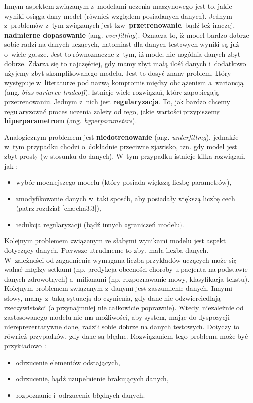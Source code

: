 Innym aspektem związanym z~modelami uczenia maszynowego jest to, jakie wyniki osiąga dany model (również względem posiadanych danych). Jednym z~problemów z~tym związanych jest tzw. \textbf{przetrenowanie}, bądź też inaczej, \textbf{nadmierne dopasowanie} (ang. \textit{overfitting}). Oznacza to, iż model bardzo dobrze sobie radzi na danych uczących, natomiast dla danych testowych wyniki są już o~wiele gorsze. Jest to równoznaczne z~tym, iż model nie uogólnia danych zbyt dobrze. Zdarza się to najczęściej, gdy mamy zbyt małą ilość danych i~dodatkowo użyjemy zbyt skomplikowanego modelu. Jest to dosyć znany problem, który występuje w~literaturze pod nazwą kompromis między obciążeniem a~wariancją (ang. \textit{bias-variance tradeoff}). Istnieje wiele rozwiązań, które zapobiegają przetrenowaniu. Jednym z~nich jest \textbf{regularyzacja}. To, jak bardzo chcemy regularyzować proces uczenia zależy od tego, jakie wartości przypiszemy \textbf{hiperparametrom} (ang. \textit{hyperparameters}). 

Analogicznym problemem jest \textbf{niedotrenowanie} (ang. \textit{underfitting}), jednakże w~tym przypadku chodzi o~dokładnie przeciwne zjawisko, tzn. gdy model jest zbyt prosty (w stosunku do danych). W~tym przypadku istnieje kilka rozwiązań, jak \cite{Sawka18}:
\begin{itemize}
\item
wybór mocniejszego modelu (który posiada większą liczbę parametrów),
\item
zmodyfikowanie danych w~taki sposób, aby posiadały większą liczbę cech (patrz rozdział \ref{cha:cha3.3}),
\item
redukcja regularyzacji (bądź innych ograniczeń modelu).
\end{itemize} 
  
Kolejnym problemem związanym ze słabymi wynikami modelu jest aspekt dotyczący danych. Pierwsze utrudnienie to zbyt mała liczba danych. W~zależności od zagadnienia wymagana liczba przykładów uczących może się wahać między setkami (np. predykcja obecności choroby u pacjenta na podstawie danych zdrowotnych) a~milionami (np. rozpoznawanie mowy, klasyfikacja tekstu). Kolejnym problemem związanym z~danymi jest zaszumienie danych. Innymi słowy, mamy z~taką sytuacją do czynienia, gdy dane nie odzwierciedlają rzeczywistości (a przynajmniej nie całkowicie poprawnie). Wtedy, niezależnie od zastosowanego modelu nie ma możliwości, aby system, mając do dyspozycji niereprezentatywne dane, radził sobie dobrze na danych testowych. Dotyczy to również przypadków, gdy dane są błędne. Rozwiązaniem tego problemu może być przykładowo \cite{Sawka18}:
\begin{itemize}
\item
odrzucenie elementów odstających,
\item
odrzucenie, bądź uzupełnienie brakujących danych,
\item
rozpoznanie i~odrzucenie błędnych danych.
\end{itemize}

